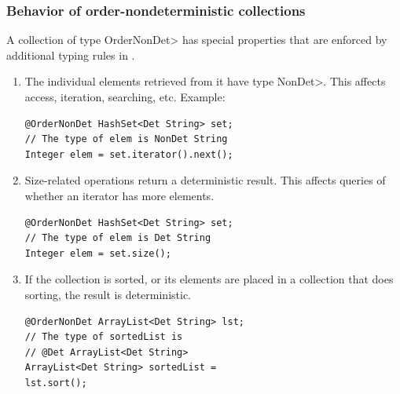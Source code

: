 \subsubsection{Behavior of order-nondeterministic collections}\label{sec:ond-behavior}
A collection of type \<OrderNonDet> has special properties that are enforced by additional typing rules in \ourTypeSystem.

\begin{enumerate}
    \item
    The individual elements retrieved from it have type \<NonDet>.  This
    affects access, iteration, searching, etc.
    Example: 
    \begin{verbatim}
@OrderNonDet HashSet<Det String> set; 
// The type of elem is NonDet String
Integer elem = set.iterator().next();
    \end{verbatim}
    \vspace{-0.4cm}
    \item
    Size-related operations return a deterministic result.  This affects
    queries of whether an iterator has more elements.
    \begin{verbatim}
@OrderNonDet HashSet<Det String> set; 
// The type of elem is Det String
Integer elem = set.size();
    \end{verbatim}
    \vspace{-0.4cm}
    \item
    If the collection is sorted, or its elements are placed in a collection
    that does sorting, the result is deterministic.
    \begin{verbatim}
@OrderNonDet ArrayList<Det String> lst; 
// The type of sortedList is 
// @Det ArrayList<Det String>
ArrayList<Det String> sortedList = 
lst.sort();
    \end{verbatim}
    \vspace{-0.4cm}
\end{enumerate}


